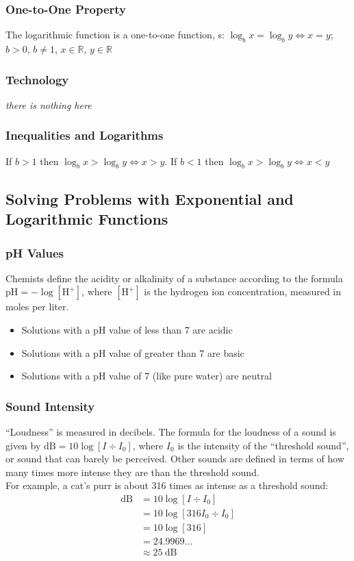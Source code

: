 \documentclass{article}
\begin{document}
	\subsubsection{One-to-One Property}
	The logarithmic function is a one-to-one function, s: $\log_bx=\log_by\Leftrightarrow x=y$; $b>0$, $b\ne1$, $x\in\mathbb{R}$, $y\in\mathbb{R}$
	\subsubsection{Technology}
	\textit{there is nothing here}
	\subsubsection{Inequalities and Logarithms}
	If $b>1$ then $\log_bx>\log_by\Leftrightarrow x>y$. If $b<1$ then $\log_bx>\log_by\Leftrightarrow x<y$
	\subsection{Solving Problems with Exponential and Logarithmic Functions}
	\subsubsection{pH Values}
	Chemists define the acidity or alkalinity of a substance according to the formula $\text{pH}=-\log[\text{H}^+]$, where $[\text{H}^+]$ is the hydrogen ion concentration, measured in moles per liter.
	\begin{itemize}
		\item Solutions with a pH value of less than 7 are acidic
		\item Solutions with a pH value of greater than 7 are basic
		\item Solutions with a pH value of 7 (like pure water) are neutral
	\end{itemize}
	\subsubsection{Sound Intensity}
	``Loudness'' is measured in decibels. The formula for the loudness of a sound is given by $\text{dB}=10\log[I\div I_0]$, where $I_0$ is the intensity of the ``threshold sound'', or sound that can barely be perceived. Other sounds are defined in terms of how many times more intense they are than the threshold sound.\\
	For example, a cat's purr is about 316 times as intense as a threshold sound:
	\begin{align*}
		\text{dB}&=10\log[I\div I_0]\\
		&=10\log[316I_0\div I_0]\\
		&=10\log[316]\\
		&=24.9969...\\
		&\approx\SI{25}{\deci\bel}
	\end{align*}
\end{document}
